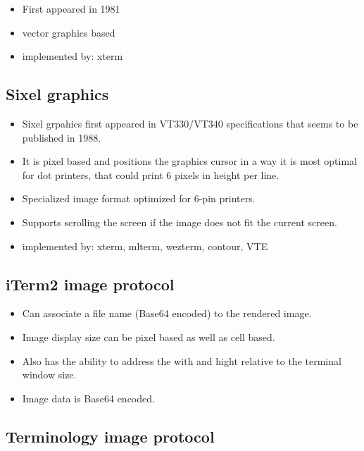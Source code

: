 \documentclass{article}
\begin{document}
\begin{itemize}
    \item First appeared in 1981
    \item vector graphics based
    \item implemented by: xterm
\end{itemize}

\subsection{Sixel graphics}

\begin{itemize}
    \item Sixel grpahics first appeared in VT330/VT340 specifications that seems to be published in 1988.
    \item It is pixel based and positions the graphics cursor in a way it is most optimal for dot printers,
        that could print 6 pixels in height per line.
    \item Specialized image format optimized for 6-pin printers.
    \item Supports scrolling the screen if the image does not fit the current screen.
    \item implemented by: xterm, mlterm, wezterm, contour, VTE
\end{itemize}

\subsection{iTerm2 image protocol}

\begin{itemize}
    \item Can associate a file name (Base64 encoded) to the rendered image.
    \item Image display size can be pixel based as well as cell based.
    \item Also has the ability to address the with and hight relative to the terminal window size.
    \item Image data is Base64 encoded.
\end{itemize}


\subsection{Terminology image protocol}
\end{document}
